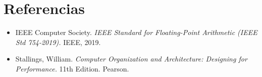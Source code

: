 \documentclass[11pt]{article}
\begin{document}
\section{Referencias}
\label{sec:org1bdbd12}

\begin{itemize}
\item IEEE Computer Society. \emph{IEEE Standard for Floating-Point Arithmetic
(IEEE Std 754-2019).} IEEE, 2019.

\item Stallings, William. \emph{Computer Organization and Architecture:
Designing for Performance.} 11th Edition. Pearson.
\end{itemize}
\end{document}
